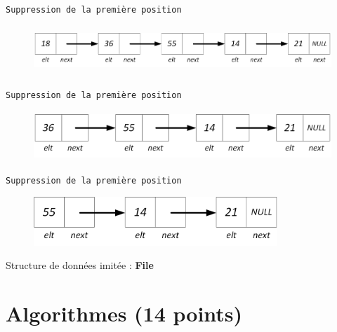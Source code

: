 \documentclass[11pt,a4paper]{article}
\begin{document}
\begin{center}
\texttt{Suppression de la première position}

\begin{figure}[ht!]
\centering
\centerline{  %
\includegraphics[height=1.85cm]{img/f-4-Liste_p_5.png}
}
\end{figure}


\texttt{Suppression de la première position}

\begin{figure}[ht!]
\centering
\centerline{  %
\includegraphics[height=1.85cm]{img/f-5-Liste_p_4.png}
}
\end{figure}


\texttt{Suppression de la première position}

\begin{figure}[ht!]
\centering
\centerline{  %
\includegraphics[height=1.85cm]{img/f-6-Liste_p_3.png}
}
\end{figure}

\bigskip

\end{center}

Structure de données imitée : \textbf{File}

\bigskip



\clearpage

%
\section{Algorithmes (14 points)}
\end{document}

